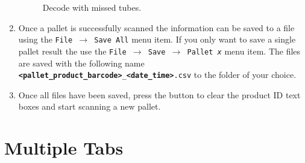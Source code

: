 \begin{enumerate}
\begin{figure}[H]
	   \caption{Decode with missed tubes.}
	   \label{fig:scan_missed_tube}
\end{figure}
\item Once a pallet is successfully scanned the information can be saved to a
  file using the \texttt{File $\to$ Save All} menu item. If you only want to
  save a single pallet result the use the \texttt{File $\to$ Save $\to$ Pallet
    \emph{x}} menu item. The files are saved with the following name
  \texttt{\textbf{<pallet\_product\_barcode>}\_\textbf{<date\_time>}.csv} to
  the folder of your choice.
\item Once all files have been saved, press the  button to
  clear the product ID text boxes and start scanning a new pallet.
\end{enumerate}

\section{Multiple Tabs}
